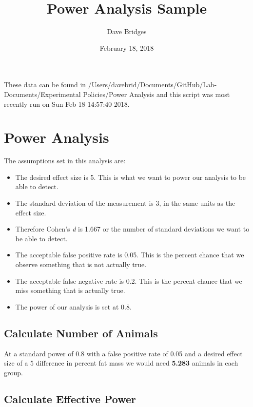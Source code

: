 \documentclass[]{article}
\title{Power Analysis Sample}
\author{Dave Bridges}
\date{February 18, 2018}
\providecommand{\tightlist}{%
  \setlength{\itemsep}{0pt}\setlength{\parskip}{0pt}}
\begin{document}
\maketitle

{
\setcounter{tocdepth}{2}
\tableofcontents
}
These data can be found in
/Users/davebrid/Documents/GitHub/Lab-Documents/Experimental
Policies/Power Analysis and this script was most recently run on Sun Feb
18 14:57:40 2018.

\section{Power Analysis}\label{power-analysis}

The assumptions set in this analysis are:

\begin{itemize}
\tightlist
\item
  The desired effect size is 5. This is what we want to power our
  analysis to be able to detect.
\item
  The standard deviation of the measurement is 3, in the same units as
  the effect size.
\item
  Therefore Cohen's \emph{d} is 1.667 or the number of standard
  deviations we want to be able to detect.
\item
  The acceptable false positive rate is 0.05. This is the percent chance
  that we observe something that is not actually true.
\item
  The acceptable false negative rate is 0.2. This is the percent chance
  that we miss something that is actually true.
\item
  The power of our analysis is set at 0.8.
\end{itemize}

\subsection{Calculate Number of
Animals}\label{calculate-number-of-animals}

At a standard power of 0.8 with a false positive rate of 0.05 and a
desired effect size of a 5 difference in percent fat mass we would need
\textbf{5.283} animals in each group.

\subsection{Calculate Effective Power}\label{calculate-effective-power}
\end{document}
